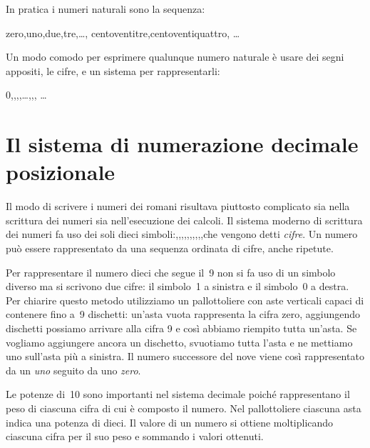 In pratica i numeri naturali sono la sequenza:

zero,\quad uno,\quad due,\quad tre,\quad \dots,\quad
centoventitre,\quad centoventiquattro,\quad 
\dots

Un modo comodo per esprimere qualunque numero naturale è usare dei segni 
appositi, le cifre, e un sistema per rappresentarli:

0,,,,\quad \dots,,, \dots

\section{Il sistema di numerazione decimale posizionale}
\label{sec:nat_sist10}

Il modo di scrivere i numeri dei romani risultava piuttosto complicato sia 
nella scrittura dei numeri sia nell'esecuzione dei calcoli. 
Il sistema moderno di scrittura dei numeri fa uso dei soli dieci 
simboli:,,,,,,,,,,\quad che vengono detti \emph{cifre}.
Un numero può essere rappresentato da una sequenza ordinata di cifre, 
anche ripetute.

Per rappresentare il numero dieci che segue il~9 non si fa uso di un 
simbolo diverso ma si scrivono due cifre: il simbolo~1 a sinistra e il 
simbolo~0 a destra. 
Per chiarire questo metodo utilizziamo un pallottoliere con aste 
verticali capaci di contenere fino a~9 dischetti: 
un'asta vuota rappresenta la cifra zero, aggiungendo dischetti possiamo 
arrivare alla cifra 9 e così abbiamo riempito tutta un'asta. 
Se vogliamo aggiungere ancora un dischetto, svuotiamo tutta l'asta e ne 
mettiamo uno sull'asta più a sinistra.
Il numero successore del nove viene così rappresentato da un \emph{uno} 
seguito da uno \emph{zero}.


Le potenze di~10 sono importanti nel sistema decimale poiché 
rappresentano il peso di ciascuna cifra di cui è composto il numero. 
Nel pallottoliere ciascuna asta indica una potenza di dieci. 
Il valore di un numero si ottiene moltiplicando ciascuna cifra per il
suo peso e sommando i valori ottenuti.

